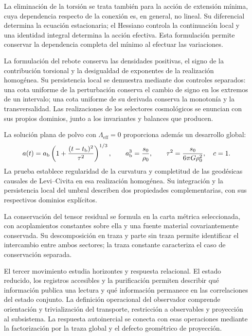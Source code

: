 La eliminación de la torsión se trata también para la acción de
extensión mínima, cuya dependencia respecto de la conexión es, en
general, no lineal. Su diferencial determina la ecuación estacionaria;
el Hessiano controla la continuación local y una identidad integral
determina la acción efectiva. Esta formulación permite conservar la
dependencia completa del mínimo al efectuar las variaciones.

La formulación del rebote conserva las densidades positivas, el signo de
la contribución torsional y la desigualdad de exponentes de la realización
homogénea. Su persistencia local se demuestra mediante dos controles
separados: una cota uniforme de la perturbación conserva el cambio de
signo en los extremos de un intervalo; una cota uniforme de su derivada
conserva la monotonía y la transversalidad. Las realizaciones de los
selectores cosmológicos se enuncian con sus propios dominios, junto a los
invariantes y balances que producen.

La solución plana de polvo con \(\Lambda_{\mathrm{eff}}=0\)
proporciona además un desarrollo global:
\[
 a(t)=a_{\rm b}\left(1+
       \frac{(t-t_{\rm b})^2}{\tau^2}\right)^{1/3},
 \qquad
 a_{\rm b}^3=\frac{s_0}{\rho_0},\qquad
 \tau^2=\frac{s_0}{6\pi G\rho_0^2},
 \quad c=1.
\]
La prueba establece regularidad de la curvatura y completitud de las
geodésicas causales de Levi--Civita en esa realización homogénea.
Su integración y la persistencia local
del umbral describen dos propiedades complementarias, con sus
respectivos dominios explícitos.

La conservación del tensor residual se formula en la carta métrica
seleccionada, con acoplamientos constantes sobre ella y una fuente
material covariantemente conservada. Su descomposición en traza y parte
sin traza permite identificar el intercambio entre ambos sectores;
la traza constante caracteriza el caso de conservación separada.

El tercer movimiento estudia horizontes y respuesta relacional. El estado
reducido, los registros accesibles y la purificación permiten describir
qué información publica una lectura y qué información permanece en las
correlaciones del estado conjunto. La definición operacional del
observador comprende orientación y trivialización del transporte,
restricción a observables y proyección al subsistema. La respuesta
autoinercial se conecta con esas operaciones mediante la factorización
por la traza global y el defecto geométrico de proyección.

